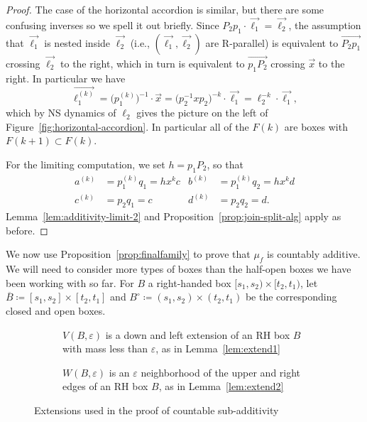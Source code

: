 \documentclass[11pt]{amsart}
\newcommand{\ora}[1]{\overrightarrow{#1}}
\newcommand*{\svgfignormal}[1]{\fontsize{9pt}{9pt}\selectfont}
\numberwithin{equation}{section}
\numberwithin{figure}{section}
\theoremstyle{definition}
\theoremstyle{plain}
\renewcommand{\epsilon}{\varepsilon}
\begin{document}
\begin{proof}
The case of the horizontal accordion is similar, but there are some
confusing inverses so we spell it out briefly.
Since $P_2 p_1 \cdot \ora{\ell_1} = \ora{\ell_2}$,
the assumption that $\ora{\ell_1}$
is nested inside $\ora{\ell_2}$ (i.e., $(\ora{\ell_1},\ora{\ell_2})$ are R-parallel) is equivalent to $\ora{P_2 p_1}$ 
crossing $\ora{\ell_2}$ to the right, which in turn is equivalent to $\ora{p_1 P_2}$
crossing $\ora{x}$ to the right. In particular we have
\[
  \ora{\ell_1^{(k)}} = \bigl(p_1^{(k)}\bigr)^{-1} \cdot \ora{x}
  = \bigl(p_2^{-1} x p_2)^{-k} \cdot \ora{\ell_1}
  = \ell_2^{-k} \cdot \ora{\ell_1},
\]
which by NS dynamics of $\ell_2$ gives the picture on the left of
Figure~\ref{fig:horizontal-accordion}. In particular all of the $F(k)$
are boxes with $F(k+1) \subset F(k)$.

For the limiting computation, we set $h = p_1 P_2$, so that
\begin{align*}
  a^{(k)} &= p_1^{(k)} q_1 = h x^k c &
  b^{(k)} &= p_1^{(k)} q_2 = h x^k d\\
  c^{(k)} &= p_2 q_1 = c &
  d^{(k)} &= p_2 q_2 = d.
\end{align*}
Lemma~\ref{lem:additivity-limit-2} and
Proposition~\ref{prop:join-split-alg} apply as before.
\end{proof}

  \begin{figure}
\centering{
\resizebox{120mm}{!}{\svgfignormal{h-accordion}}
\caption{Horizontal accordion $F(\vec{p_1},q_1,p_2,q_2)$}
  \label{fig:horizontal-accordion}
}
\end{figure}

We now use Proposition~\ref{prop:finalfamily} to prove that $\mu_f$
is countably additive.
We will need to consider more types of boxes
than the half-open boxes we have been working with so far. For $B$ a
right-handed box $[s_1,s_2) \times [t_2,t_1)$, let
$\overline{B} \coloneqq [s_1,s_2] \times [t_2,t_1]$ and
$B^\circ \coloneqq (s_1,s_2) \times (t_2,t_1)$ be the corresponding
closed and open boxes.

\begin{figure}
     \centering
     \begin{subfigure}[b]{0.47\textwidth}
        \svgfignormal{ca1}
        \caption{$V(B,\epsilon)$ is a down and left extension of an RH
          box $B$ with mass less than $\epsilon$, as in Lemma~\ref{lem:extend1}}\label{fig:ca1}
     \end{subfigure}
     \hfill
     \begin{subfigure}[b]{0.47\textwidth}
        \svgfignormal{ca2}
        \caption{$W(B,\epsilon)$ is an $\epsilon$ neighborhood of the upper and right edges of an RH box $B$, as in Lemma~\ref{lem:extend2}}\label{fig:ca2}
     \end{subfigure}
     \caption{Extensions used in the proof of countable sub-additivity}
     \label{fig:cases}
\end{figure}
\end{document}
